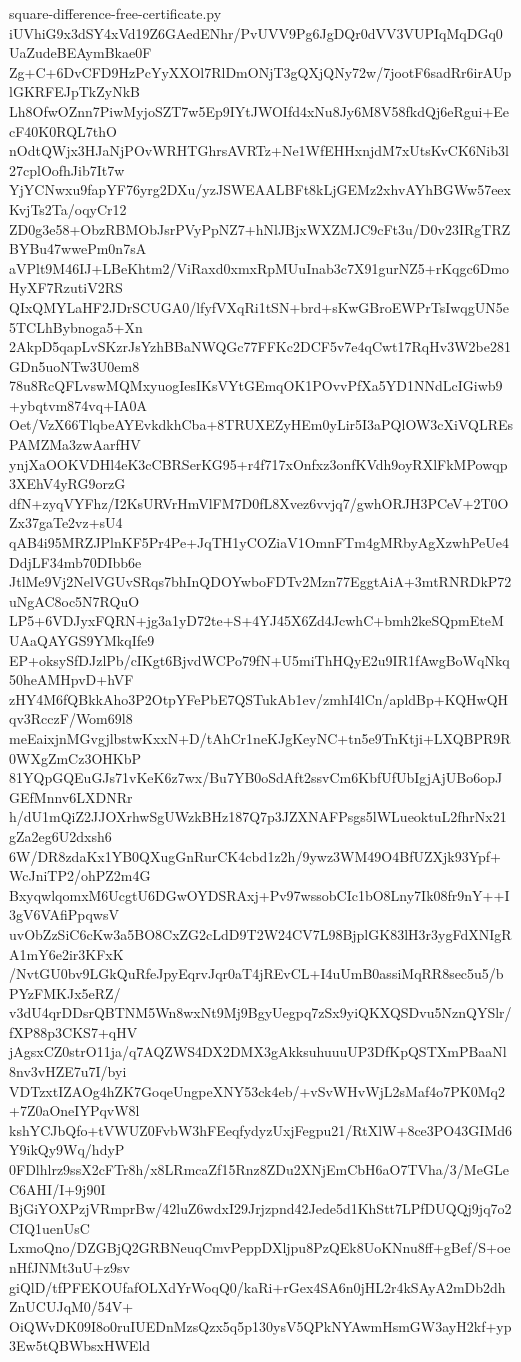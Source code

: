 \documentclass[11pt]{article}
\theoremstyle{definition}
\theoremstyle{remark}
\begin{document}
\begin{filecontents*}[overwrite]{square-difference-free-certificate.py}
iUVhiG9x3dSY4xVd19Z6GAedENhr/PvUVV9Pg6JgDQr0dVV3VUPIqMqDGq0UaZudeBEAymBkae0F
Zg+C+6DvCFD9HzPcYyXXOl7RlDmONjT3gQXjQNy72w/7jootF6sadRr6irAUplGKRFEJpTkZyNkB
Lh8OfwOZnn7PiwMyjoSZT7w5Ep9IYtJWOIfd4xNu8Jy6M8V58fkdQj6eRgui+EecF40K0RQL7thO
nOdtQWjx3HJaNjPOvWRHTGhrsAVRTz+Ne1WfEHHxnjdM7xUtsKvCK6Nib3l27cplOofhJib7It7w
YjYCNwxu9fapYF76yrg2DXu/yzJSWEAALBFt8kLjGEMz2xhvAYhBGWw57eexKvjTs2Ta/oqyCr12
ZD0g3e58+ObzRBMObJsrPVyPpNZ7+hNlJBjxWXZMJC9cFt3u/D0v23IRgTRZBYBu47wwePm0n7sA
aVPlt9M46IJ+LBeKhtm2/ViRaxd0xmxRpMUuInab3c7X91gurNZ5+rKqgc6DmoHyXF7RzutiV2RS
QIxQMYLaHF2JDrSCUGA0/lfyfVXqRi1tSN+brd+sKwGBroEWPrTsIwqgUN5e5TCLhBybnoga5+Xn
2AkpD5qapLvSKzrJsYzhBBaNWQGc77FFKc2DCF5v7e4qCwt17RqHv3W2be281GDn5uoNTw3U0em8
78u8RcQFLvswMQMxyuogIesIKsVYtGEmqOK1POvvPfXa5YD1NNdLcIGiwb9+ybqtvm874vq+IA0A
Oet/VzX66TlqbeAYEvkdkhCba+8TRUXEZyHEm0yLir5I3aPQlOW3cXiVQLREsPAMZMa3zwAarfHV
ynjXaOOKVDHl4eK3cCBRSerKG95+r4f717xOnfxz3onfKVdh9oyRXlFkMPowqp3XEhV4yRG9orzG
dfN+zyqVYFhz/I2KsURVrHmVlFM7D0fL8Xvez6vvjq7/gwhORJH3PCeV+2T0OZx37gaTe2vz+sU4
qAB4i95MRZJPlnKF5Pr4Pe+JqTH1yCOZiaV1OmnFTm4gMRbyAgXzwhPeUe4DdjLF34mb70DIbb6e
JtlMe9Vj2NelVGUvSRqs7bhInQDOYwboFDTv2Mzn77EggtAiA+3mtRNRDkP72uNgAC8oc5N7RQuO
LP5+6VDJyxFQRN+jg3a1yD72te+S+4YJ45X6Zd4JcwhC+bmh2keSQpmEteMUAaQAYGS9YMkqIfe9
EP+oksySfDJzlPb/cIKgt6BjvdWCPo79fN+U5miThHQyE2u9IR1fAwgBoWqNkq50heAMHpvD+hVF
zHY4M6fQBkkAho3P2OtpYFePbE7QSTukAb1ev/zmhI4lCn/apldBp+KQHwQHqv3RcczF/Wom69l8
meEaixjnMGvgjlbstwKxxN+D/tAhCr1neKJgKeyNC+tn5e9TnKtji+LXQBPR9R0WXgZmCz3OHKbP
81YQpGQEuGJs71vKeK6z7wx/Bu7YB0oSdAft2ssvCm6KbfUfUbIgjAjUBo6opJGEfMnnv6LXDNRr
h/dU1mQiZ2JJOXrhwSgUWzkBHz187Q7p3JZXNAFPsgs5lWLueoktuL2fhrNx21gZa2eg6U2dxsh6
6W/DR8zdaKx1YB0QXugGnRurCK4cbd1z2h/9ywz3WM49O4BfUZXjk93Ypf+WcJniTP2/ohPZ2m4G
BxyqwlqomxM6UcgtU6DGwOYDSRAxj+Pv97wssobCIc1bO8Lny7Ik08fr9nY++I3gV6VAfiPpqwsV
uvObZzSiC6cKw3a5BO8CxZG2cLdD9T2W24CV7L98BjplGK83lH3r3ygFdXNIgRA1mY6e2ir3KFxK
/NvtGU0bv9LGkQuRfeJpyEqrvJqr0aT4jREvCL+I4uUmB0assiMqRR8sec5u5/bPYzFMKJx5eRZ/
v3dU4qrDDsrQBTNM5Wn8wxNt9Mj9BgyUegpq7zSx9yiQKXQSDvu5NznQYSlr/fXP88p3CKS7+qHV
jAgsxCZ0strO11ja/q7AQZWS4DX2DMX3gAkksuhuuuUP3DfKpQSTXmPBaaNl8nv3vHZE7u7I/byi
VDTzxtIZAOg4hZK7GoqeUngpeXNY53ck4eb/+vSvWHvWjL2sMaf4o7PK0Mq2+7Z0aOneIYPqvW8l
kshYCJbQfo+tVWUZ0FvbW3hFEeqfydyzUxjFegpu21/RtXlW+8ce3PO43GIMd6Y9ikQy9Wq/hdyP
0FDlhlrz9ssX2cFTr8h/x8LRmcaZf15Rnz8ZDu2XNjEmCbH6aO7TVha/3/MeGLeC6AHI/I+9j90I
BjGiYOXPzjVRmprBw/42luZ6wdxI29Jrjzpnd42Jede5d1KhStt7LPfDUQQj9jq7o2CIQ1uenUsC
LxmoQno/DZGBjQ2GRBNeuqCmvPeppDXljpu8PzQEk8UoKNnu8ff+gBef/S+oenHfJNMt3uU+z9sv
giQlD/tfPFEKOUfafOLXdYrWoqQ0/kaRi+rGex4SA6n0jHL2r4kSAyA2mDb2dhZnUCUJqM0/54V+
OiQWvDK09I8o0ruIUEDnMzsQzx5q5p130ysV5QPkNYAwmHsmGW3ayH2kf+yp3Ew5tQBWbsxHWEld

\end{filecontents*}
\end{document}
